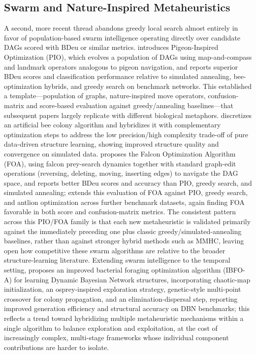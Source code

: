 \subsection{Swarm and Nature-Inspired Metaheuristics}
A second, more recent thread abandons greedy local search almost entirely in favor of population-based swarm intelligence operating directly over candidate DAGs scored with BDeu or similar metrics. \cite{kareem2019pigeon} introduces Pigeon-Inspired Optimization (PIO), which evolves a population of DAGs using map-and-compass and landmark operators analogous to pigeon navigation, and reports superior BDeu scores and classification performance relative to simulated annealing, bee-optimization hybrids, and greedy search on benchmark networks. This established a template---population of graphs, nature-inspired move operators, confusion-matrix and score-based evaluation against greedy/annealing baselines---that subsequent papers largely replicate with different biological metaphors. \cite{sun2019hybrid} discretizes an artificial bee colony algorithm and hybridizes it with complementary optimization steps to address the low precision/high complexity trade-off of pure data-driven structure learning, showing improved structure quality and convergence on simulated data. \cite{kareem2021falcon} proposes the Falcon Optimization Algorithm (FOA), using falcon prey-search dynamics together with standard graph-edit operations (reversing, deleting, moving, inserting edges) to navigate the DAG space, and reports better BDeu scores and accuracy than PIO, greedy search, and simulated annealing; \cite{awla2023comparative} extends this evaluation of FOA against PIO, greedy search, and antlion optimization across further benchmark datasets, again finding FOA favorable in both score and confusion-matrix metrics. The consistent pattern across this PIO/FOA family is that each new metaheuristic is validated primarily against the immediately preceding one plus classic greedy/simulated-annealing baselines, rather than against stronger hybrid methods such as MMHC, leaving open how competitive these swarm algorithms are relative to the broader structure-learning literature. Extending swarm intelligence to the temporal setting, \cite{meng2024dynamic} proposes an improved bacterial foraging optimization algorithm (IBFO-A) for learning Dynamic Bayesian Network structures, incorporating chaotic-map initialization, an osprey-inspired exploration strategy, genetic-style multi-point crossover for colony propagation, and an elimination-dispersal step, reporting improved generation efficiency and structural accuracy on DBN benchmarks; this reflects a trend toward hybridizing multiple metaheuristic mechanisms within a single algorithm to balance exploration and exploitation, at the cost of increasingly complex, multi-stage frameworks whose individual component contributions are harder to isolate.

